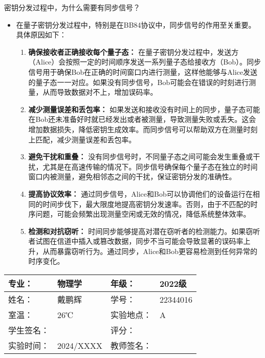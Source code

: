 \documentclass[dvipsnames, svgnames,a4paper,11pt]{article}
\begin{document}
\begin{question}
	密钥分发过程中，为什么需要有同步信号？
\end{question}

	\begin{itemize}
		\item 在量子密钥分发过程中，特别是在BB84协议中，同步信号的作用至关重要。具体原因如下：
		
		\begin{enumerate}
			\item \textbf{确保接收者正确接收每个量子态：}  
			在量子密钥分发过程中，发送方（Alice）会按照一定的时间顺序发送一系列量子态给接收方（Bob）。同步信号用于确保Bob在正确的时间窗口内进行测量，这样他能够与Alice发送的量子态一一对应。如果没有同步信号，Bob可能会在错误的时刻进行测量，从而导致数据对不上，增加误码率。

			\item \textbf{减少测量误差和丢包率：}  
			如果发送和接收没有时间上的同步，量子态可能在Bob还未准备好时就已经发出或者被测量，导致测量失败或丢失。这会增加数据损失，降低密钥生成效率。而同步信号可以帮助双方在测量时刻上匹配，减少测量误差和丢包率。

			\item \textbf{避免干扰和重叠：}  
			没有同步信号时，不同量子态之间可能会发生重叠或干扰，尤其是在高速传输的情况下。同步信号确保每个量子态在独立的时间窗口内被测量，避免相邻态之间的干扰，保证密钥分发的准确性。

			\item \textbf{提高协议效率：}  
			通过同步信号，Alice和Bob可以协调他们的设备运行在相同的时间步伐下，最大限度地提高密钥分发速率。否则，由于不匹配的时序问题，可能会频繁出现测量空闲或无效的情况，降低系统整体效率。

			\item \textbf{检测和对抗窃听：}  
			时间同步能够提高对潜在窃听者的检测能力。如果窃听者试图在信道中插入或篡改数据，同步不当可能会导致显著的误码率上升，从而暴露窃听行为。通过同步，Alice和Bob更容易检测到任何异常的时序变化。
		\end{enumerate}

	\end{itemize}


\clearpage
\begin{table}
	\renewcommand\arraystretch{1.7}
	\centering
	\begin{tabularx}{\textwidth}{|X|X|X|X|}
	\hline
	专业：& 物理学 &年级：& 2022级 \\
	\hline
	姓名：& 戴鹏辉 & 学号：& 22344016 \\
	\hline
	室温：& 26℃ & 实验地点： & A \\
	\hline
	学生签名：& & 评分： &\\
	\hline
	实验时间：& 2024/XXXX& 教师签名：&\\
	\hline
	\end{tabularx}
\end{table}
\end{document}
